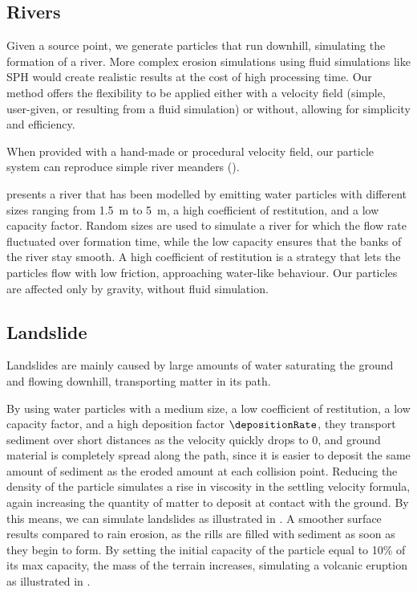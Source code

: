 \subsection{Rivers}

Given a source point, we generate particles that run downhill, simulating the formation of a river. More complex erosion simulations using fluid simulations like SPH \cite{Kristof2009} would create realistic results at the cost of high processing time. Our method offers the flexibility to be applied either with a velocity field (simple, user-given, or resulting from a fluid simulation) or without, allowing for simplicity and efficiency.

When provided with a hand-made or procedural velocity field, our particle system can reproduce simple river meanders (). 

 presents a river that has been modelled by emitting water particles with different sizes ranging from \SI{1.5}{\meter} to \SI{5}{\meter}, a high coefficient of restitution, and a low capacity factor. Random sizes are used to simulate a river for which the flow rate fluctuated over formation time, while the low capacity ensures that the banks of the river stay smooth. A high coefficient of restitution is a strategy that lets the particles flow with low friction, approaching water-like behaviour. Our particles are affected only by gravity, without fluid simulation.

\subsection{Landslide}

Landslides are mainly caused by large amounts of water saturating the ground and flowing downhill, transporting matter in its path.

By using water particles with a medium size, a low coefficient of restitution, a low capacity factor, and a high deposition factor $\depositionRate$, they transport sediment over short distances as the velocity quickly drops to 0, and ground material is completely spread along the path, since it is easier to deposit the same amount of sediment as the eroded amount at each collision point. Reducing the density of the particle simulates a rise in viscosity in the settling velocity formula, again increasing the quantity of matter to deposit at contact with the ground. By this means, we can simulate landslides as illustrated in . A smoother surface results compared to rain erosion, as the rills are filled with sediment as soon as they begin to form.  
By setting the initial capacity of the particle equal to 10\% of its max capacity, the mass of the terrain increases, simulating a volcanic eruption as illustrated in .

